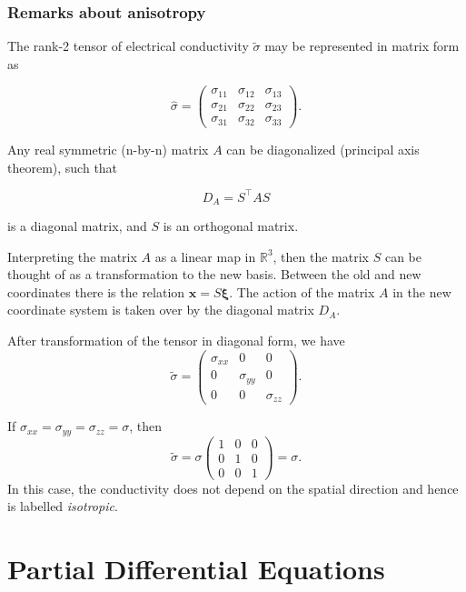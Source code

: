 \documentclass[
  a4paper,
  DIV=11,
  numbers=noendperiod]{scrreprt}
\begin{document}
\subsection{Remarks about anisotropy}\label{remarks-about-anisotropy}

The rank-2 tensor of electrical conductivity \(\tilde\sigma\) may be
represented in matrix form as

\[
  \hat\sigma = 
  \begin{pmatrix}
    \sigma_{11} & \sigma_{12} & \sigma_{13} \\
    \sigma_{21} & \sigma_{22} & \sigma_{23} \\
    \sigma_{31} & \sigma_{32} & \sigma_{33} 
  \end{pmatrix}.
\]

Any real symmetric (n-by-n) matrix \(A\) can be diagonalized (principal
axis theorem), such that

\[
D_A = S^\top A S  
\]

is a diagonal matrix, and \(S\) is an orthogonal matrix.

Interpreting the matrix \(A\) as a linear map in \(\mathbb {R} ^3\),
then the matrix \(S\) can be thought of as a transformation to the new
basis. Between the old and new coordinates there is the relation
\(\mathbf {x}=S \boldsymbol {\xi }\). The action of the matrix \(A\) in
the new coordinate system is taken over by the diagonal matrix
\(D_{A}\).

After transformation of the tensor in diagonal form, we have \[ 
  \tilde\sigma = 
  \begin{pmatrix}
    \sigma_{xx} & 0 & 0 \\
    0 & \sigma_{yy} & 0 \\
    0 & 0 & \sigma_{zz} 
  \end{pmatrix}.
\]

If \(\sigma_{xx} = \sigma_{yy} = \sigma_{zz} = \sigma\), then \[
  \tilde\sigma = \sigma
  \begin{pmatrix}
    1 & 0 & 0 \\
    0 & 1 & 0 \\
    0 & 0 & 1 
  \end{pmatrix} = \sigma.
\] In this case, the conductivity does not depend on the spatial
direction and hence is labelled \emph{isotropic}.

\chapter{Partial Differential
Equations}\label{partial-differential-equations}
\end{document}
